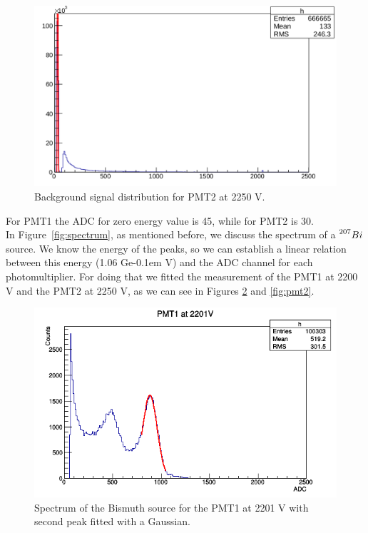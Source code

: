 \documentclass[10pt,swedish, openany]{book}
\def\MeV{\ifmmode {\mathrm{\ Me\kern -0.1em V}}\else
                   \textrm{Ge\kern -0.1em V}\fi}%
\begin{document}
\begin{figure}[H]
\includegraphics[scale=0.3]{background2.png}
\centering
\caption{Background signal distribution for PMT2 at 2250 V.}
\label{fig:bck2}
\end{figure}

For PMT1 the ADC for zero energy value is 45, while for PMT2 is 30.\\

In Figure~\ref{fig:spectrum}, as mentioned before, we discuss the spectrum of a $\prescript{207}{}{Bi}$ source. We know the energy of the peaks, so  we can establish a linear relation between this energy (1.06 \MeV) and the ADC channel for each photomultiplier. For doing that we fitted the measurement of the PMT1 at 2200 V and the PMT2 at 2250 V, as we can see in Figures \ref{fig:pmt1} and \ref{fig:pmt2}.

\begin{figure}[H]
\includegraphics[scale=0.5]{PMT1_2201V.png}
\centering
\caption{Spectrum of the Bismuth source for the PMT1 at 2201 V with second peak fitted with a Gaussian.}
\label{fig:pmt1}
\end{figure}
\end{document}
